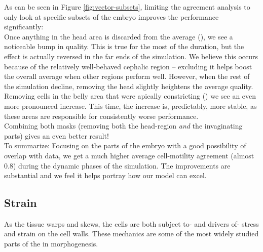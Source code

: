 As can be seen in Figure \ref{fig:vector-subsets}, limiting the agreement analysis to only look at specific subsets of the embryo improves the performance significantly:\\

Once anything in the head area is discarded from the average (), we see a noticeable bump in quality. This is true for the most of the duration, but the effect is actually reversed in the far ends of the simulation. We believe this occurs because of the relatively well-behaved cephalic region --  excluding it helps boost the overall average when other regions perform well. However, when the rest of the simulation decline, removing the head slightly heightens the average quality. \\

Removing cells in the belly area that were apically constricting () we see an even more pronounced increase. This time, the increase is, predictably, more stable, as these areas are responsible for consistently worse performance. \\

Combining both masks (removing both the head-region \textit{and} the invaginating parts) gives an even better result! \\


To summarize: Focusing on the parts of the embryo with a good possibility of overlap with data, we get a much higher average cell-motility agreement (almost 0.8) during the dynamic phases of the simulation. The improvements are substantial and we feel it helps portray how our model can excel.

\subsection{Strain}
As the tissue warps and skews, the cells are both subject to- and drivers of- stress and strain on the cell walls. These mechanics are some of the most widely studied parts of the in morphogenesis.\\

